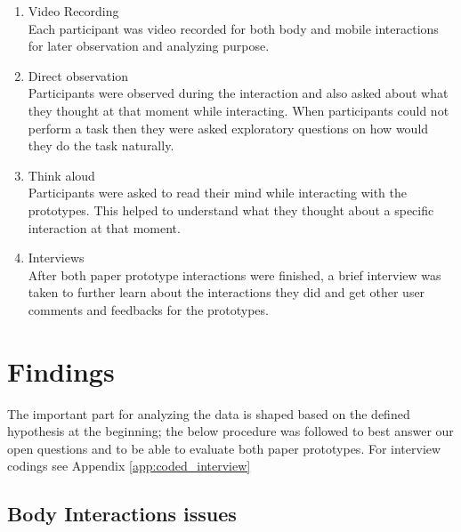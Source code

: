 \begin{enumerate}
\item Video Recording \\
Each participant was video recorded for both body and mobile interactions for later observation and analyzing purpose. 

\item Direct observation \\
Participants were observed during the interaction and also asked about what they thought at that moment while interacting. When participants could not perform a task then they were asked exploratory questions on how would they do the task naturally.

\item Think aloud \\
Participants were asked to read their mind while interacting with the prototypes. This helped to understand what they thought about a specific interaction at that moment. 

\item Interviews \\
After both paper prototype interactions were finished, a brief interview was taken to further learn about the interactions they did and get other user comments and feedbacks for the prototypes.
\end{enumerate}



\section{Findings}
The important part for analyzing the data is shaped based on the defined hypothesis at the beginning; the below procedure was followed to best answer our open questions and to be able to evaluate both paper prototypes. For interview codings 
see Appendix \ref{app:coded_interview}

\subsection{Body Interactions issues}

